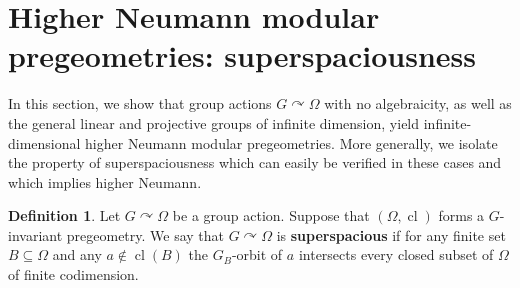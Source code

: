 \documentclass{article}
\newtheorem{lemma}[theorem]{Lemma}
\theoremstyle{remark}
\newtheorem{remark}[theorem]{Remark}
\theoremstyle{definition}
\newtheorem{definition}[theorem]{Definition}
\def\acts{\curvearrowright}
\newcommand{\indep}[2]{%
  \mathrel{
    \mathop{
      \vcenter{
        \hbox{\oalign{\noalign{\kern-.3ex}\hfil$\vert$\rlap{$^\mathrm{#2}$}\hfil\cr
              \noalign{\kern-.7ex}
              $\smile$\cr\noalign{\kern-.3ex}}}
      }
    }\displaylimits_{#1}
  }
}
\DeclareMathOperator{\cl}{cl}
\DeclareMathOperator{\acl}{acl}
\def\Ind#1#2{#1\setbox0=\hbox{$#1x$}\kern\wd0\hbox to 0pt{\hss$#1\mid$\hss}
	\lower.9\ht0\hbox to 0pt{\hss$#1\smile$\hss}\kern\wd0}
\def\ind{\mathop{\mathpalette\Ind{}}}
\begin{document}
{\section{Higher Neumann modular pregeometries: superspaciousness}\label{sect:superspacious}

In this section, we show that group actions  $G\acts\Omega$ with no algebraicity,  as well as  the general linear and projective groups of infinite dimension,  %
 {yield} infinite-dimensional higher Neumann modular pregeometries. More generally, we isolate the property of superspaciousness which can easily be verified in these cases and which implies higher Neumann.








\begin{definition} 
Let $G\acts\Omega$ be a group action.  Suppose that  $(\Omega, {\cl})$ forms a $G$-invariant %
pregeometry. %
 We say that $G\acts\Omega$ is \textbf{superspacious} if for any {finite} %
set $B\subseteq\Omega$ and any 
{$a\not\in{\cl}(B)$}
the $G_B$-orbit of $a$ intersects every closed subset of $\Omega$ %
 of finite codimension.
\end{definition}

}
\end{document}
